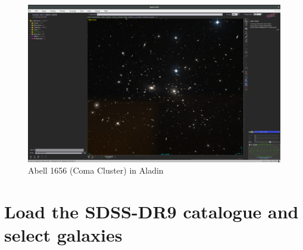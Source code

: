 \documentclass [a4paper, 12pt]{article}
\newcommand{\aladin}{{\textsc{A}{ladin}}}
\begin{document}
\begin{figure}[H]
\center
\includegraphics[width=0.6 \textwidth]{../images/aladin_a1656_new.png}
\caption{Abell 1656 (Coma Cluster) in \aladin}
\label{fig:aladinA1656}
\end{figure}

\section{Load the SDSS-DR9 catalogue and select galaxies}
\end{document}
